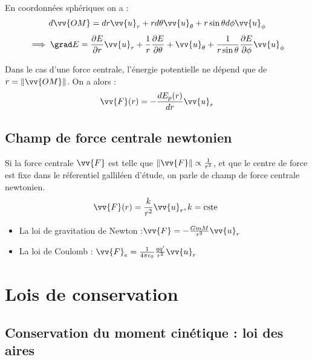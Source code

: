 \begin{corollary}
    En coordonnées sphériques on a : 
    \[
        d \vv{OM} = dr\vv{u}_{r} + r d \theta\vv{u}_{\theta} + r \sin \theta d \phi \vv{u}_{\phi}
    \]
    \[
        \implies \grad E = \frac{\partial E}{\partial r} \vv{u}_{r} + \frac{1}{r}\frac{\partial E}{\partial \theta} + \vv{u}_{\theta} + \frac{1}{r\sin \theta}\frac{\partial E}{\partial \phi} \vv{u}_{\phi} 
    \]
\end{corollary}

\begin{corollary}
    Dans le cas d'une force centrale, l'énergie potentielle ne dépend que de \(r = \lVert \vv{OM} \rVert \). On a alors : 
    \[
        \vv{F}(r) = - \frac{dE_{p}(r)}{dr} \vv{u}_{r}
    \]
\end{corollary}

\subsection{Champ de force centrale newtonien}

\begin{definition}
    Si la force centrale \(\vv{F}\) est telle que \(\lVert \vv{F} \rVert \propto \frac{1}{r^{2}}\), et que le centre de force est fixe dans le réferentiel galliléen d'étude, on parle de champ de force centrale newtonien.  
    \[
        \vv{F}(r) = \frac{k}{r^{2}} \vv{u}_{r}, k = \text{cste }
    \]
\end{definition}

\begin{eg}[Exemple]
    \begin{itemize}
        \item La loi de gravitation de Newton :\(\vv{F} = -\frac{GmM}{r^{2}}\vv{u}_{r}\)
        \item La loi de Coulomb : \(\vv{F}_{e} = \frac{1}{4\pi \epsilon_{0}} \frac{qq'}{r^{2}} \vv{u}_{r} \)  
    \end{itemize}
\end{eg}


\section{Lois de conservation}
\subsection{Conservation du moment cinétique : loi des aires}

